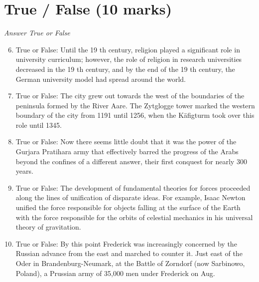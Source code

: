 \documentclass[12pt]{article}
\begin{document}
\section*{True / False (10 marks)}
\textit{Answer True or False}
\begin{enumerate}[label=\arabic*.]
\setcounter{enumi}{5}
\item True or False: Until the 19 th century, religion played a significant role in university curriculum; however, the role of religion in research universities decreased in the 19 th century, and by the end of the 19 th century, the German university model had spread around the world.
\item True or False: The city grew out towards the west of the boundaries of the peninsula formed by the River Aare. The Zytglogge tower marked the western boundary of the city from 1191 until 1256, when the Käfigturm took over this role until 1345.
\item True or False: Now there seems little doubt that it was the power of the Gurjara Pratihara army that effectively barred the progress of the Arabs beyond the confines of a different answer, their first conquest for nearly 300 years.
\item True or False: The development of fundamental theories for forces proceeded along the lines of unification of disparate ideas. For example, Isaac Newton unified the force responsible for objects falling at the surface of the Earth with the force responsible for the orbits of celestial mechanics in his universal theory of gravitation.
\item True or False: By this point Frederick was increasingly concerned by the Russian advance from the east and marched to counter it. Just east of the Oder in Brandenburg-Neumark, at the Battle of Zorndorf (now Sarbinowo, Poland), a Prussian army of 35,000 men under Frederick on Aug.
\end{enumerate}
\end{document}
